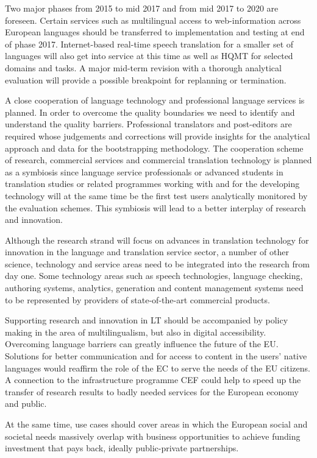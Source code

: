 \documentclass[10pt, plain]{../../metanetpaper}
\begin{document}
\begin{multicols}{2}
Two major phases from 2015 to mid 2017 and from mid 2017 to 2020 are foreseen. Certain services such as multilingual access to web-information across European languages should be transferred to implementation and testing at end of phase 2017. Internet-based real-time speech translation for a smaller set of languages will also get into service at this time as well as HQMT for selected domains and tasks. A major mid-term revision with a thorough analytical evaluation will provide a possible breakpoint for replanning or termination.
 
A close cooperation of language technology and professional language services is planned. In order to overcome the quality boundaries we need to identify and understand the quality barriers. Professional translators and post-editors are required whose judgements and corrections will provide insights for the analytical approach and data for the bootstrapping methodology. The cooperation scheme of research, commercial services and commercial translation technology is planned as a symbiosis since language service professionals or advanced students in translation studies or related programmes working with and for the developing technology will at the same time be the first test users analytically monitored by the evaluation schemes. This symbiosis will lead to a better interplay of research and innovation.

Although the research strand will focus on advances in translation technology for innovation in the language and translation service sector, a number of other science, technology and service areas need to be integrated into the research from day one. Some technology areas such as speech technologies, language checking, authoring systems, analytics, generation and content management systems need to be represented by providers of state-of-the-art commercial products.
 
Supporting research and innovation in LT should be accompanied by policy making in the area of multilingualism, but also in digital accessibility. Overcoming language barriers can greatly influence the future of the EU. Solutions for better communication and for access to content in the users' native languages would reaffirm the role of the EC to serve the needs of the EU citizens. A connection to the infrastructure programme CEF could help to speed up the transfer of research results to badly needed services for the European economy and public.

At the same time, use cases should cover areas in which the European social and societal needs massively overlap with business opportunities to achieve funding investment that pays back, ideally public-private partnerships.
 

\end{multicols}
\end{document}
